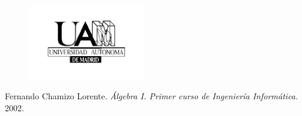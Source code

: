 \documentclass[a4paper, twoside, 11pt]{article}
\begin{document}

\begin{figure}[htbp]
    \centerline{\includegraphics[width=0.45\textwidth]{uam.png}}
\end{figure}
\vskip2cm
\tableofcontents





\newpage
{}
\begin{thebibliography}{11}
    Fernando Chamizo Lorente. \textit{Álgebra I. Primer curso de Ingeniería Informática}. 2002.
\end{thebibliography}
\end{document}
